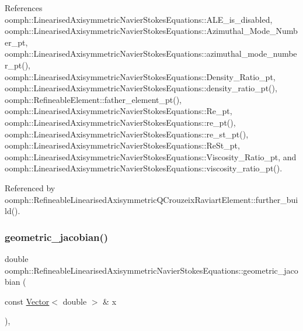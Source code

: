 References oomph\+::\+Linearised\+Axisymmetric\+Navier\+Stokes\+Equations\+::\+A\+L\+E\+\_\+is\+\_\+disabled, oomph\+::\+Linearised\+Axisymmetric\+Navier\+Stokes\+Equations\+::\+Azimuthal\+\_\+\+Mode\+\_\+\+Number\+\_\+pt, oomph\+::\+Linearised\+Axisymmetric\+Navier\+Stokes\+Equations\+::azimuthal\+\_\+mode\+\_\+number\+\_\+pt(), oomph\+::\+Linearised\+Axisymmetric\+Navier\+Stokes\+Equations\+::\+Density\+\_\+\+Ratio\+\_\+pt, oomph\+::\+Linearised\+Axisymmetric\+Navier\+Stokes\+Equations\+::density\+\_\+ratio\+\_\+pt(), oomph\+::\+Refineable\+Element\+::father\+\_\+element\+\_\+pt(), oomph\+::\+Linearised\+Axisymmetric\+Navier\+Stokes\+Equations\+::\+Re\+\_\+pt, oomph\+::\+Linearised\+Axisymmetric\+Navier\+Stokes\+Equations\+::re\+\_\+pt(), oomph\+::\+Linearised\+Axisymmetric\+Navier\+Stokes\+Equations\+::re\+\_\+st\+\_\+pt(), oomph\+::\+Linearised\+Axisymmetric\+Navier\+Stokes\+Equations\+::\+Re\+St\+\_\+pt, oomph\+::\+Linearised\+Axisymmetric\+Navier\+Stokes\+Equations\+::\+Viscosity\+\_\+\+Ratio\+\_\+pt, and oomph\+::\+Linearised\+Axisymmetric\+Navier\+Stokes\+Equations\+::viscosity\+\_\+ratio\+\_\+pt().



Referenced by oomph\+::\+Refineable\+Linearised\+Axisymmetric\+Q\+Crouzeix\+Raviart\+Element\+::further\+\_\+build().

\mbox{\label{classoomph_1_1RefineableLinearisedAxisymmetricNavierStokesEquations_a6ac5e611a2b85e304329374a0a35cee0}} 
\subsubsection{\texorpdfstring{geometric\+\_\+jacobian()}{geometric\_jacobian()}}
{\footnotesize\ttfamily double oomph\+::\+Refineable\+Linearised\+Axisymmetric\+Navier\+Stokes\+Equations\+::geometric\+\_\+jacobian (\begin{DoxyParamCaption}\item[{const \hyperlink{classoomph_1_1Vector}{Vector}$<$ double $>$ \&}]{x }\end{DoxyParamCaption})\hspace{0.3cm}{\ttfamily [inline]}, {\ttfamily [virtual]}}



